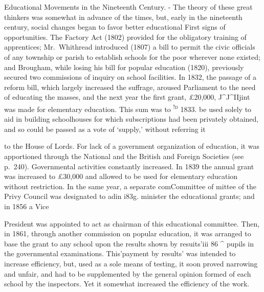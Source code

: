 \documentclass[]{book}
\begin{document}
Educational Movements in the Nineteenth Century. - The theory of these great thinkers was somewhat in advance of the times, but, early in the nineteenth century, social changes began to favor better educational First signs of opportunities. The Factory Act (1802) provided for the obligatory training of apprentices; Mr.~Whithread introduced (1807) a bill to permit the civic officials of any township or parish to establish schools for the poor wherever none existed; and Brougham, while losing his bill for popular education (1820), previously secured two commissions of inquiry on school facilities. In 1832, the passage of a reform bill, which largely increased the suffrage, aroused Parliament to the need of educating the masses, and the next year the first grant, £20,000, J\^{}J\^{}IIjint was made for elementary education. This sum was to \textsc{\textsuperscript{!d} }1833. be used solely to aid in building schoolhouses for which subscriptions had been privately obtained, and so could be passed as a vote of `supply,' without referring it

to the House of Lords. For lack of a government organization of education, it was apportioned through the National and the British and Foreign Societies (see p.~240). Governmental activities constantly increased. In 1839 the annual grant was increased to £30,000 and allowed to be used for elementary education without restriction. In the same year, a separate comCommittee of mittee of the Privy Council was designated to adin i83g. minister the educational grants; and in 1856 a Vice

President was appointed to act as chairman of this educational committee. Then, in 1861, through another commission on popular education, it was arranged to base the grant to any school upon the results shown by resuits'iii 86 \^{} pupils in the governmental examinations. This'payment by results' was intended to increase efficiency, but, used as a sole means of testing, it soon proved narrowing and unfair, and had to be supplemented by the general opinion formed of each school by the inspectors. Yet it somewhat increased the efficiency of the work.
\end{document}
